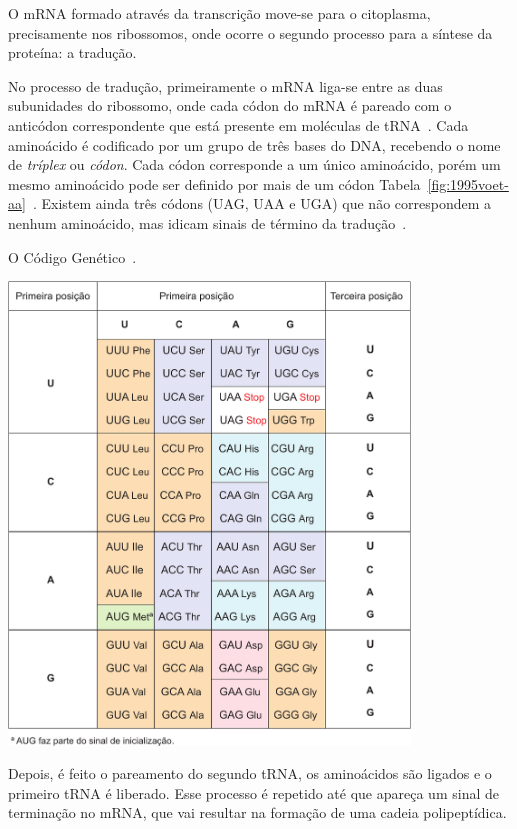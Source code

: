 O mRNA formado através da transcrição move-se para o citoplasma, precisamente nos ribossomos, onde ocorre o segundo processo para a síntese da proteína: a tradução.

\newpage
No processo de tradução, primeiramente o mRNA liga-se entre as duas subunidades do ribossomo, onde cada códon do mRNA é pareado com o anticódon correspondente que está presente em moléculas de tRNA~\citep{silva:2001}. Cada aminoácido é codificado por um grupo de três bases do DNA, recebendo o nome de \textit{tríplex} ou \textit{códon}. Cada códon corresponde a um único aminoácido, porém um mesmo aminoácido pode ser definido por mais de um códon Tabela~\ref{fig:1995voet-aa}~\citep{silva:2001,lopes:1998}. Existem ainda três códons (UAG, UAA e UGA) que não correspondem a nenhum aminoácido, mas idicam sinais de término da tradução~\citep{silva:2001}. 

\begin{table}[ht]
\caption{O Código Genético~\citep{voet:1995}. \label{fig:1995voet-aa}}
\centering
\includegraphics[angle=0,width=0.8\textwidth]{imagens//1995voet-aa}
\end{table}

Depois, é feito o pareamento do segundo tRNA, os aminoácidos são ligados e o primeiro tRNA é liberado. Esse processo é repetido até que apareça um sinal de terminação no mRNA, que vai resultar na formação de uma cadeia polipeptídica.

